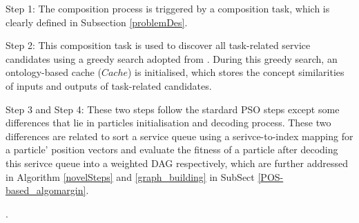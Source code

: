 \documentclass{llncs}
\begin{document}
Step 1: The composition process is triggered by a composition task, which is clearly defined in Subsection \ref{problemDes}. 

Step 2: This composition task is used to discover all task-related service candidates using a greedy search adopted from \cite{ma2015hybrid}. During this greedy search, an ontology-based cache ($Cache$) is initialised, which stores the concept similarities of inputs and outputs of task-related candidates. 

Step 3 and Step 4: These two steps follow the stardard PSO steps \cite{shi2001particle} except some differences that lie in  particles initialisation and decoding process. These two differences are related to sort a service queue using a serivce-to-index mapping for a particle' position vectors and evaluate the fitness of a particle after decoding this serivce queue into a weighted DAG respectively, which are further addressed in Algorithm \ref{novelSteps} and \ref{graph_building} in SubSect \ref{POS-based_algomargin}.

.
\end{document}
